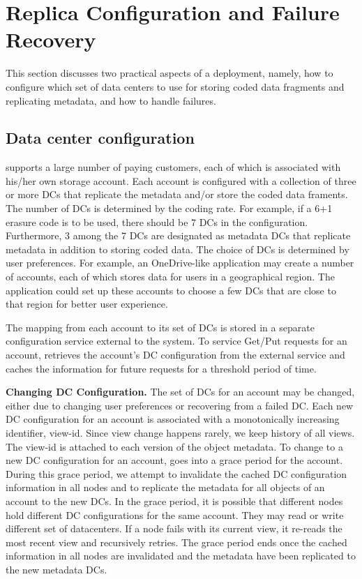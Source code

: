 \section{Replica Configuration and Failure Recovery}

This section discusses two practical aspects of a {\name} deployment, namely,
how to configure which set of data centers to use for storing coded data
fragments and replicating metadata, and how to handle failures.

\subsection{Data center configuration}

\name supports a large number of paying customers, each of which is associated
with his/her own storage account.  Each \name account is configured with a
collection of three or more DCs that replicate the metadata and/or store the
coded data framents.  The number of DCs is determined by the coding rate. For example, if a 
6+1 erasure code is to be used, there should be 7 DCs in the configuration.  
Furthermore, 3 among the 7 DCs are designated as metadata DCs that replicate 
metadata in addition to storing coded data.
The choice of DCs is determined by user preferences.  For
example, an OneDrive-like application may create a number of {\name} accounts,
each of which stores data for users in a geographical region. The application
could set up these accounts to choose a few DCs that are close to that
region for better user experience.

The mapping from each \name account to its set of DCs is stored in a
separate configuration service external to the \name system.  To service
Get/Put requests for an account, \name retrieves the account's DC configuration
from the external service and caches the information for future requests for a
threshold period of time.

{\bf Changing DC Configuration.} 
The set of DCs for an account may be changed, either due to changing user
preferences or recovering from a failed DC.  Each new DC configuration for an
account is associated with a monotonically increasing identifier, view-id.
Since view change happens rarely, we keep history of all views.  The view-id is
attached to each version of the object metadata. To change to a new DC
configuration for an account, {\name} goes into a grace period for the account.
During this grace period, we attempt to invalidate the cached DC configuration
information in all {\name} nodes and to replicate the metadata for all objects
of an account to the new DCs. In the grace period, it is possible that
different nodes hold different DC configurations for the same account. They may
read or write different set of datacenters. If a {\name} node fails with its
current view, it re-reads the most recent view and recursively retries. The
grace period ends once the cached information in all {\name} nodes are
invalidated and the metadata have been replicated to the new metadata DCs.

